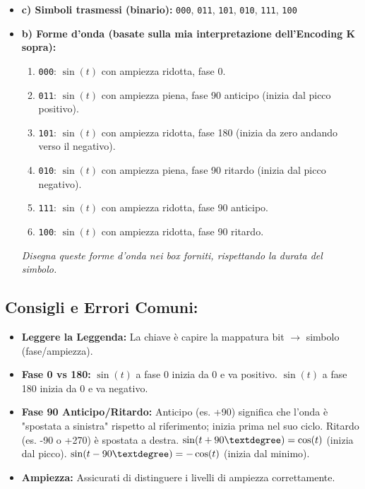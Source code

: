 \begin{itemize}
\begin{itemize}
    \end{itemize}
    \item \textbf{c) Simboli trasmessi (binario):}
    \texttt{000}, \texttt{011}, \texttt{101}, \texttt{010}, \texttt{111}, \texttt{100}
    \item \textbf{b) Forme d'onda (basate sulla mia interpretazione dell'Encoding K sopra):}
    \begin{enumerate}
        \item \texttt{000}: $\sin(t)$ con ampiezza ridotta, fase 0\textdegree.
        \item \texttt{011}: $\sin(t)$ con ampiezza piena, fase 90\textdegree{} anticipo (inizia dal picco positivo).
        \item \texttt{101}: $\sin(t)$ con ampiezza ridotta, fase 180\textdegree{} (inizia da zero andando verso il negativo).
        \item \texttt{010}: $\sin(t)$ con ampiezza piena, fase 90\textdegree{} ritardo (inizia dal picco negativo).
        \item \texttt{111}: $\sin(t)$ con ampiezza ridotta, fase 90\textdegree{} anticipo.
        \item \texttt{100}: $\sin(t)$ con ampiezza ridotta, fase 90\textdegree{} ritardo.
    \end{enumerate}
    \textit{Disegna queste forme d'onda nei box forniti, rispettando la durata del simbolo.}
\end{itemize}

\subsection{Consigli e Errori Comuni:}
\begin{itemize}
    \item \textbf{Leggere la Leggenda:} La chiave è capire la mappatura bit $\to$ simbolo (fase/ampiezza).
    \item \textbf{Fase 0 vs 180:} $\sin(t)$ a fase 0\textdegree{} inizia da 0 e va positivo. $\sin(t)$ a fase 180\textdegree{} inizia da 0 e va negativo.
    \item \textbf{Fase 90 Anticipo/Ritardo:} Anticipo (es. +90\textdegree) significa che l'onda è "spostata a sinistra" rispetto al riferimento; inizia prima nel suo ciclo. Ritardo (es. -90\textdegree{} o +270\textdegree) è spostata a destra. $\sin(t+90\textdegree) = \cos(t)$ (inizia dal picco). $\sin(t-90\textdegree) = -\cos(t)$ (inizia dal minimo).
    \item \textbf{Ampiezza:} Assicurati di distinguere i livelli di ampiezza correttamente.
\end{itemize}

